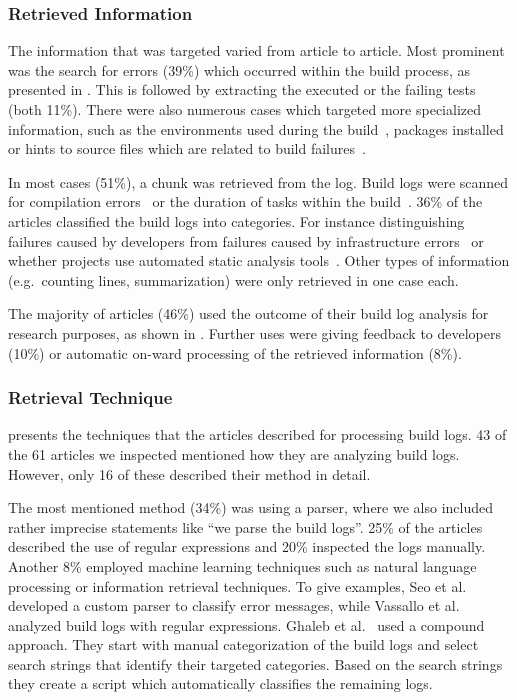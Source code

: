 \subsubsection{Retrieved Information}
The information that was targeted varied from article to article.
Most prominent was the search for errors (39\%) which occurred within
the build process, as presented in .
This is followed by extracting the executed or the failing
tests (both 11\%).
There were also numerous cases which targeted more specialized
information, such as the environments used during the
build~\cite{zolfagharinia2017not}, packages
installed~\cite{selberg2012use} or hints to source files which are
related to build failures~\cite{ren2018automated}.

In most cases (51\%), a chunk was retrieved from the log.
Build logs were scanned for compilation
errors~\cite{clemencic2014new} or
the duration of tasks within the build~\cite{zhang2016android}.
36\% of the articles classified the build logs into categories.
For instance distinguishing failures caused by developers from
failures caused
by infrastructure errors~\cite{lindqvist2019detection} or
whether projects use automated static analysis
tools~\cite{kavaler2019tool}.
Other types of information (e.g.\ counting
lines, summarization) were only retrieved
in one case each.

The majority of articles (46\%) used the outcome of their build log
analysis for research purposes, as shown in .
Further uses were giving feedback to developers (10\%) or automatic
on-ward processing of the retrieved information (8\%).

\subsubsection{Retrieval Technique}
 presents the techniques that the articles
described for processing build logs.
43 of the 61 articles we inspected mentioned how they are analyzing build
logs.
However, only 16 of these described their method in detail.

The most mentioned method (34\%) was using a parser, where we also
included
rather imprecise statements like ``we parse the build logs''.
25\% of the articles described the use of regular expressions and 20\%
inspected the logs manually.
Another 8\% employed machine learning techniques such as natural language
processing or information retrieval techniques.
To give examples,
Seo et al.~\cite{seo2014programmers} developed a custom
parser to classify error messages, while Vassallo et
al.~\cite{vassallo2017a-tale} analyzed build logs with regular
expressions.
Ghaleb et al.~\cite{ghaleb2019studying} used a compound approach.
They start with manual categorization of the build logs and select
search strings that identify their targeted categories.
Based on the search strings they create a script which automatically
classifies the remaining logs.

